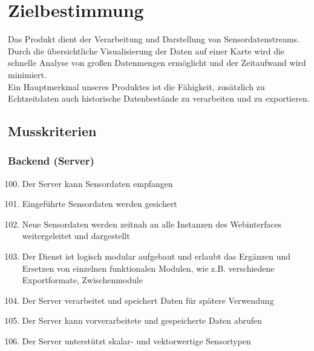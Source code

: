 \chapter{Zielbestimmung}
Das Produkt dient der Verarbeitung und Darstellung von Sensordatenstreams. Durch die übersichtliche Visualisierung der Daten auf einer Karte wird die schnelle Analyse von großen Datenmengen ermöglicht und der Zeitaufwand wird minimiert.\\
Ein Hauptmerkmal unseres Produktes ist die Fähigkeit, zusätzlich zu Echtzeitdaten auch historische Datenbestände zu verarbeiten und zu exportieren.
\section{Musskriterien}
\subsection{Backend (Server)}
\begin{enumerate}[label=\textbf{MK\arabic{enumi}0}]
	\setcounter{enumi}{99}
	\item Der Server kann Sensordaten empfangen
	\item Eingeführte Sensordaten werden gesichert
	\item Neue Sensordaten werden zeitnah an alle Instanzen des Webinterfaces weitergeleitet und dargestellt
	\item Der Dienst ist logisch modular aufgebaut und erlaubt das Ergänzen und Ersetzen von einzelnen funktionalen Modulen, wie z.B. verschiedene Exportformate, Zwischenmodule
	\item Der Server verarbeitet und speichert Daten für spätere Verwendung
	\item Der Server kann vorverarbeitete und gespeicherte Daten abrufen
	\item Der Server unterstützt skalar- und vektorwertige Sensortypen
\end{enumerate}
